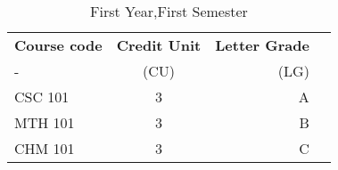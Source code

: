 \documentclass{article}
\begin{document}
 
	
\begin{table}[h!]
	\begin{center}
		\caption{First Year,First Semester}
		\label{tab:table1}
		\begin{tabular}{l|c|r|c}
			\textbf{Course code} & \textbf{Credit Unit} &
			\textbf{Letter Grade}\\
			- & (CU) & (LG) \\
			\hline
			CSC 101 & 3 & A\\
		    MTH 101 & 3 & B\\
		    CHM 101 & 3 & C\\
		\end{tabular}
	\end{center}
\end{table}
\end{document}
